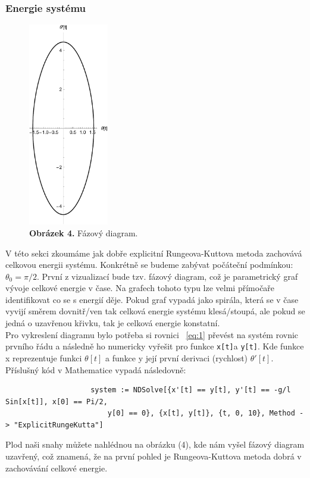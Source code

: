 \documentclass[reqno, a4paper]{amsart}
\begin{document}
				\subsubsection{Energie systému}
				\label{sec:sys-energy}
				\begin{figure}
					\includegraphics[width=3.5cm]{Runge - Kutta, Fazovy diagram}
					\caption*{\textbf{Obrázek 4.} Fázový diagram.}
				\end{figure}
				V této sekci zkoumáme jak dobře explicitní Rungeova-Kuttova metoda zachovává celkovou energii systému. Konkrétně se budeme zabývat počáteční podmínkou: $\theta_{0} = \pi /2$. První z vizualizací bude tzv. fázový diagram, což je parametrický graf vývoje celkové energie v čase. Na grafech tohoto typu lze velmi přímočaře identifikovat co se s energií děje. Pokud graf vypadá jako spirála, která se v čase vyvijí směrem dovnitř/ven tak celková energie systému klesá/stoupá, ale pokud se jedná o uzavřenou křivku, tak je celková energie konstatní.\\
				Pro vykreslení diagramu bylo potřeba si rovnici ~\eqref{eq:1} převést na systém rovnic prvního řádu a následně ho numericky vyřešit pro funkce \verb|x[t]|a \verb|y[t]|. Kde funkce x reprezentuje funkci $\theta [t]$ a funkce y její první derivaci (rychlost) $\theta' [t]$. Příslušný kód v Mathematice vypadá následovně:
				\begin{verbatim}
					system := NDSolve[{x'[t] == y[t], y'[t] == -g/l Sin[x[t]], x[0] == Pi/2,
						y[0] == 0}, {x[t], y[t]}, {t, 0, 10}, Method -> "ExplicitRungeKutta"]
				\end{verbatim}
				Plod naši snahy můžete nahlédnou na obrázku (4), kde nám vyšel fázový diagram uzavřený, což znamená, že na první pohled je Rungeova-Kuttova metoda dobrá v zachovávání celkové energie.\\ \\
\end{document}
